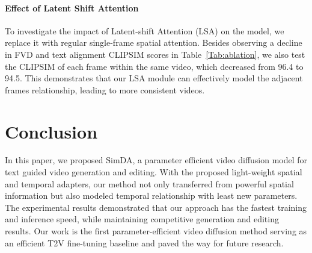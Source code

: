 \paragraph{Effect of Latent Shift Attention}
To investigate the impact of Latent-shift Attention (LSA) on the model, we replace it with regular single-frame spatial attention. Besides observing a decline in FVD and text alignment CLIPSIM scores in Table~\ref{Tab:ablation}, we also test the CLIPSIM of each frame within the same video, which decreased from 96.4 to 94.5. This demonstrates that our LSA module can effectively model the adjacent frames relationship, leading to more consistent videos.

\section{Conclusion}
In this paper, we proposed SimDA, a parameter efficient video diffusion model for text guided video generation and editing. With the proposed light-weight spatial and temporal adapters, our method not only transferred from powerful spatial information but also modeled temporal relationship with least new parameters. The experimental results demonstrated that our approach has the fastest training and inference speed, while maintaining competitive generation and editing results. Our work is the first parameter-efficient video diffusion method serving as an efficient T2V fine-tuning baseline and paved the way for future research.

{\small
}


